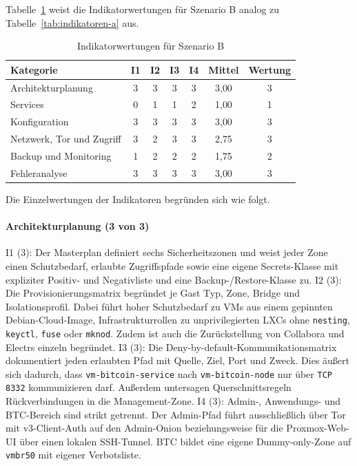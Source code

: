 Tabelle~\ref{tab:indikatoren-b} weist die Indikatorwertungen für Szenario B
analog zu Tabelle~\ref{tab:indikatoren-a} aus.

\begin{table}[H]
\centering
\small
\begin{tabular}{p{} c c c c c c}
\hline
\textbf{Kategorie} & \textbf{I1} & \textbf{I2} & \textbf{I3} & \textbf{I4} & \textbf{Mittel} & \textbf{Wertung} \\
\hline
Architekturplanung        & 3 & 3 & 3 & 3 & 3{,}00 & 3 \\
Services                  & 0 & 1 & 1 & 2 & 1{,}00 & 1 \\
Konfiguration             & 3 & 3 & 3 & 3 & 3{,}00 & 3 \\
Netzwerk, Tor und Zugriff & 3 & 2 & 3 & 3 & 2{,}75 & 3 \\
Backup und Monitoring     & 1 & 2 & 2 & 2 & 1{,}75 & 2 \\
Fehleranalyse             & 3 & 3 & 3 & 3 & 3{,}00 & 3 \\
\hline
\end{tabular}
\caption{Indikatorwertungen für Szenario B}
\label{tab:indikatoren-b}
\end{table}

Die Einzelwertungen der Indikatoren begründen sich wie folgt.

\paragraph{Architekturplanung (3 von 3)}
I1 (3): Der Masterplan definiert sechs Sicherheitszonen und weist jeder Zone einen Schutzbedarf, erlaubte Zugriffspfade sowie eine eigene Secrets-Klasse mit expliziter Positiv- und Negativliste und eine Backup-/Restore-Klasse zu.\cite{masterplanB}
I2 (3): Die Provisionierungsmatrix begründet je Gast Typ, Zone, Bridge und Isolationsprofil. Dabei führt hoher Schutzbedarf zu \acp{VM} aus einem gepinnten Debian-Cloud-Image, Infrastrukturrollen zu unprivilegierten \ac{LXC}s ohne \texttt{nesting}, \texttt{keyctl}, \texttt{fuse} oder \texttt{mknod}.
Zudem ist auch die Zurückstellung von Collabora und Electrs einzeln begründet.\cite{masterplanB}
I3 (3): Die Deny-by-default-Kommunikationsmatrix dokumentiert jeden erlaubten Pfad mit Quelle, Ziel, Port und Zweck. Dies äußert sich dadurch, dass \texttt{vm-bitcoin-service} nach \texttt{vm-bitcoin-node} nur über \texttt{TCP 8332} kommunizieren darf.
Außerdem untersagen Querschnittsregeln Rückverbindungen in die Management-Zone.\cite{masterplanB}
I4 (3): Admin-, Anwendungs- und \ac{BTC}-Bereich sind strikt getrennt. Der Admin-Pfad führt ausschließlich über Tor mit v3-Client-Auth auf den Admin-Onion beziehungsweise für die Proxmox-Web-\ac{UI} über einen lokalen \ac{SSH}-Tunnel.
\ac{BTC} bildet eine eigene Dummy-only-Zone auf \texttt{vmbr50} mit eigener Verbotsliste.\cite{masterplanB,finalsummaryB}

